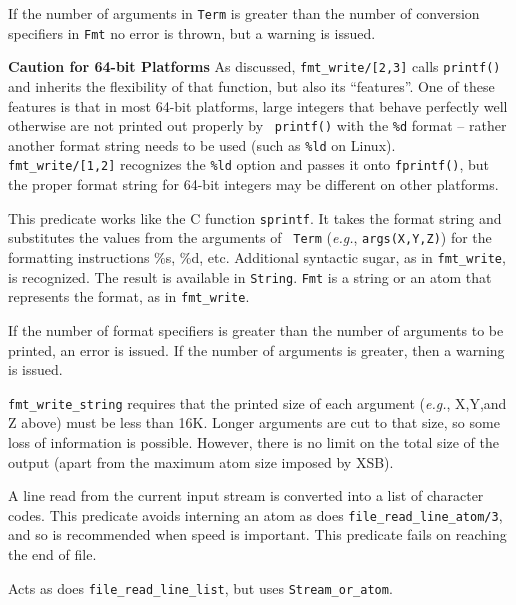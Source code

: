 \begin{description}
If the number of arguments in {\tt Term} is greater than the number of
conversion specifiers in {\tt Fmt} no error is thrown, but a warning
is issued.

{\bf Caution for 64-bit Platforms}
%
As discussed, {\tt fmt\_write/[2,3]} calls {\tt printf()} and inherits
the flexibility of that function, but also its ``features''.  One of
these features is that in most 64-bit platforms, large integers that
behave perfectly well otherwise are not printed out properly by {\tt
  printf()} with the {\tt \%d} format -- rather another format string
needs to be used (such as {\tt \%ld} on Linux).  {\tt
  fmt\_write/[1,2]} recognizes the {\tt \%ld} option and passes it
onto {\tt fprintf()}, but the proper format string for 64-bit integers
may be different on other platforms.

    This predicate works like the C function {\tt sprintf}. It takes the
    format string and substitutes the values from the arguments of {\tt
      Term} ({\it e.g.}, {\tt args(X,Y,Z)}) for the formatting instructions
    \%s, \%d, etc. Additional syntactic sugar, as in \verb|fmt_write|, is
    recognized. The result is available in {\tt String}. {\tt Fmt} is a
    string or an atom that represents the format, as in
    {\tt fmt\_write}.
    
    If the number of format specifiers is greater than the number of
    arguments to be printed, an error is issued. If the number of arguments
    is greater, then a warning is issued.

    {\tt fmt\_write\_string} requires that the printed size of each
    argument ({\it e.g.}, X,Y,and Z above) must be less than 16K. Longer
    arguments are cut to that size, so some loss of information is possible.
    However, there is no limit on the total size of the output (apart from
    the maximum atom size imposed by XSB).

A line read from the current input stream is converted into a list of
character codes.  This predicate 
avoids interning an atom as does {\tt file\_read\_line\_atom/3}, and so is
recommended when speed is important.  This predicate fails on reaching
the end of file.

Acts as does {\tt file\_read\_line\_list}, but uses {\tt Stream\_or\_atom}.


\end{description}
